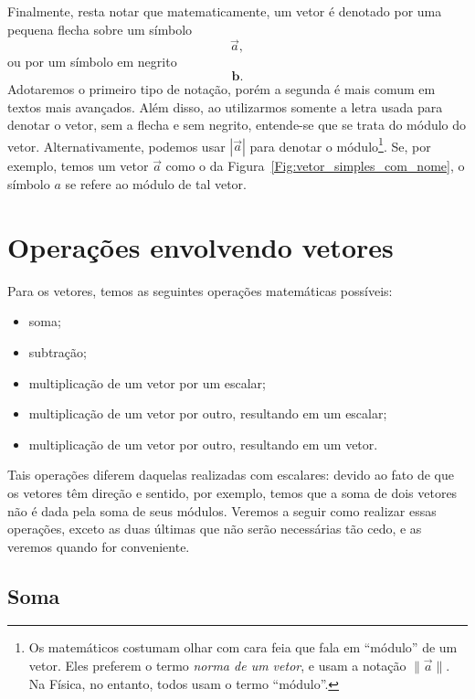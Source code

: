 Finalmente, resta notar que matematicamente, um vetor é denotado por uma pequena flecha sobre um símbolo
\begin{equation*}
    \vec{a},
\end{equation*}
%
ou por um símbolo em negrito
\begin{equation*}
    \bm{b}.
\end{equation*}
%
Adotaremos o primeiro tipo de notação, porém a segunda é mais comum em textos mais avançados. Além disso, ao utilizarmos somente a letra usada para denotar o vetor, sem a flecha e sem negrito, entende-se que se trata do módulo do vetor. Alternativamente, podemos usar $|\vec{a}|$ para denotar o módulo\footnote{Os matemáticos costumam olhar com cara feia que fala em ``módulo'' de um vetor. Eles preferem o termo \emph{norma de um vetor}, e usam a notação $\lVert\vec{a}\rVert$. Na Física, no entanto, todos usam o termo ``módulo''.}. Se, por exemplo, temos um vetor $\vec{a}$ como o da Figura~\ref{Fig:vetor_simples_com_nome}, o símbolo $a$ se refere ao módulo de tal vetor.

\section{Operações envolvendo vetores}

Para os vetores, temos as seguintes operações matemáticas possíveis:
\begin{itemize}
    \item soma;
    \item subtração;
    \item multiplicação de um vetor por um escalar;
    \item multiplicação de um vetor por outro, resultando em um escalar;
    \item multiplicação de um vetor por outro, resultando em um vetor.
\end{itemize}

Tais operações diferem daquelas realizadas com escalares: devido ao fato de que os vetores têm direção e sentido, por exemplo, temos que a soma de dois vetores não é dada pela soma de seus módulos. Veremos a seguir como realizar essas operações, exceto as duas últimas que não serão necessárias tão cedo, e as veremos quando for conveniente.

\subsection{Soma}

